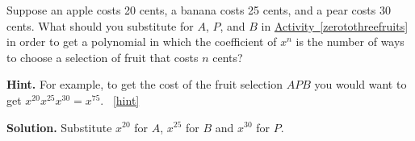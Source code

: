 \documentclass{book}
\begin{document}
\setcounter{project}{242}
\addtocounter{project}{-1}
\begin{activity}[]\label{activity-235}
\hypertarget{p-1300}{}%
Suppose an apple costs 20 cents, a banana costs 25 cents, and a pear costs 30 cents. What should you substitute for \(A\), \(P\), and \(B\) in \hyperref[zerotothreefruits]{Activity~\ref{zerotothreefruits}} in order to get a polynomial in which the coefficient of \(x^n\) is the number of ways to choose a selection of fruit that costs \(n\) cents?%
\par\smallskip%
\noindent\textbf{Hint.}\hypertarget{hint-153}{}\quad%
\hypertarget{p-1301}{}%
For example, to get the cost of the fruit selection \(AP B\) you would want to get \(x^{20} x^{25} x^{30} = x^{75}\).%
~\hfill{\tiny\hyperlink{a-242}{[hint]}\hypertarget{q-242}{}}\par\smallskip%
\noindent\textbf{Solution.}\hypertarget{solution-152}{}\quad%
\hypertarget{p-1302}{}%
Substitute \(x^{20}\) for \(A\), \(x^{25}\) for \(B\) and \(x^{30}\) for \(P\).%
\end{activity}
\end{document}
